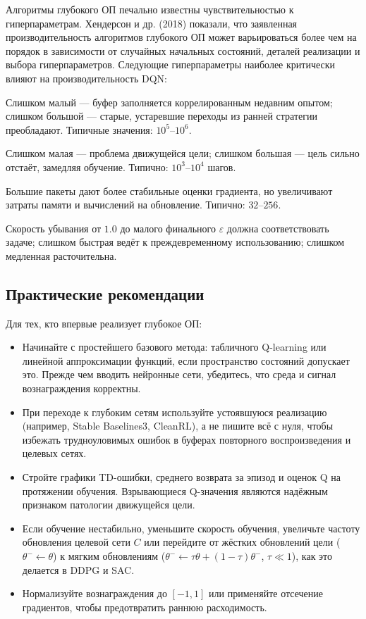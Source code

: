 Алгоритмы глубокого ОП печально известны чувствительностью к гиперпараметрам.  Хендерсон и др. (2018) показали, что заявленная производительность алгоритмов глубокого ОП может варьироваться более чем на порядок в зависимости от случайных начальных состояний, деталей реализации и выбора гиперпараметров.  Следующие гиперпараметры наиболее критически влияют на производительность DQN:
\begin{description}[leftmargin=!, labelwidth=3.5cm]
\item[Размер буфера $N$:] Слишком малый --- буфер заполняется коррелированным недавним опытом; слишком большой --- старые, устаревшие переходы из ранней стратегии преобладают.  Типичные значения: $10^5$--$10^6$.
\item[Частота обновления цели $C$:] Слишком малая --- проблема движущейся цели; слишком большая --- цель сильно отстаёт, замедляя обучение.  Типично: $10^3$--$10^4$ шагов.
\item[Размер пакета $B$:] Большие пакеты дают более стабильные оценки градиента, но увеличивают затраты памяти и вычислений на обновление.  Типично: $32$--$256$.
\item[Расписание $\varepsilon$:] Скорость убывания от $1.0$ до малого финального $\varepsilon$ должна соответствовать задаче; слишком быстрая ведёт к преждевременному использованию; слишком медленная расточительна.
\end{description}

\subsection{Практические рекомендации}

Для тех, кто впервые реализует глубокое ОП:
\begin{itemize}[leftmargin=*]
\item Начинайте с простейшего базового метода: табличного Q-learning или линейной аппроксимации функций, если пространство состояний допускает это.  Прежде чем вводить нейронные сети, убедитесь, что среда и сигнал вознаграждения корректны.
\item При переходе к глубоким сетям используйте устоявшуюся реализацию (например, Stable Baselines3, CleanRL), а не пишите всё с нуля, чтобы избежать трудноуловимых ошибок в буферах повторного воспроизведения и целевых сетях.
\item Стройте графики TD-ошибки, среднего возврата за эпизод и оценок Q на протяжении обучения.  Взрывающиеся Q-значения являются надёжным признаком патологии движущейся цели.
\item Если обучение нестабильно, уменьшите скорость обучения, увеличьте частоту обновления целевой сети $C$ или перейдите от жёстких обновлений цели ($\theta^- \leftarrow \theta$) к мягким обновлениям ($\theta^- \leftarrow \tau\theta + (1-\tau)\theta^-$, $\tau \ll 1$), как это делается в DDPG и SAC.
\item Нормализуйте вознаграждения до $[-1, 1]$ или применяйте отсечение градиентов, чтобы предотвратить раннюю расходимость.
\end{itemize}

